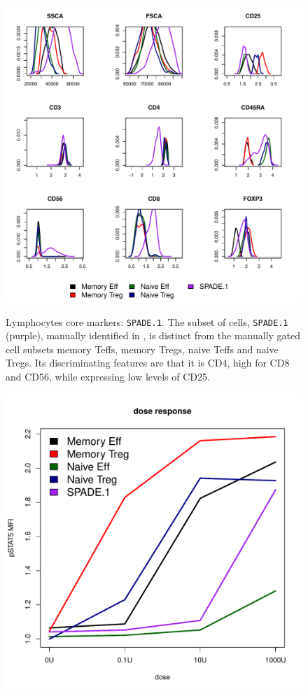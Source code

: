 %
\begin{figure}
\centering
\begin{minipage}{.65\textwidth}
\includegraphics[width=\linewidth]{figures/spade-lymphocytes-clusters}
\end{minipage}
{ Lymphocytes core markers: \texttt{SPADE.1}.  }
{ The subset of cells, \texttt{SPADE.1} (purple), manually identified in , is distinct from the manually gated cell subsets memory Teffs, memory Tregs, naive Teffs and naive Tregs. Its discriminating features are that it is CD4\negative, high for CD8 and CD56, while expressing low levels of CD25.
} 
%
\begin{minipage}{.5\textwidth}
  \includegraphics[scale=0.4]{figures/spade-lymphocytes-dose-response}

\end{minipage}
\end{figure}
